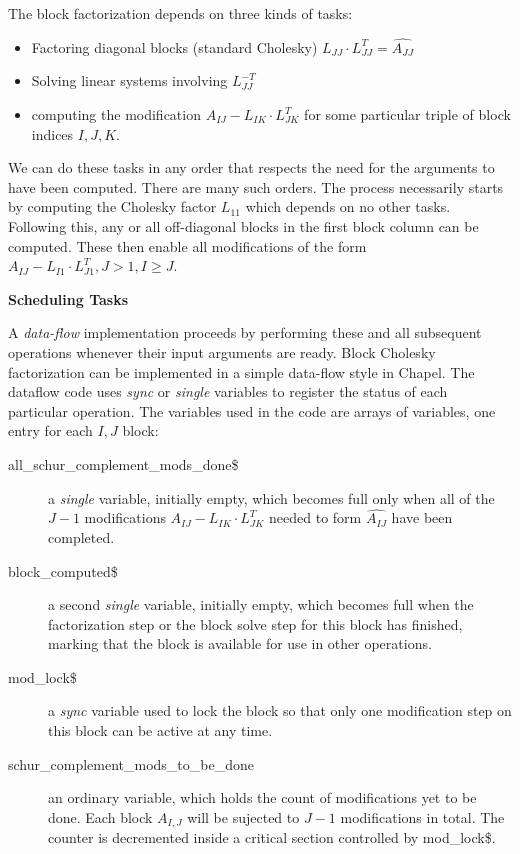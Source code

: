 \documentclass[12pt]{article}
\begin{document}
The block factorization depends on three kinds of tasks:
\begin{itemize}
\item Factoring diagonal blocks (standard Cholesky) 
  $L_{JJ} \cdot L_{JJ}^T = \widehat{A_{JJ}}$
\item Solving linear systems involving $L_{JJ}^{-T}$
\item computing the modification $A_{IJ} - L_{IK} \cdot L_{JK}^T$ for some
  particular triple of block indices $I, J, K$.
\end{itemize}
We can do these tasks in any order that respects the need for the arguments to
have been computed.  There are many such orders.  The process necessarily starts
by computing the Cholesky factor $L_{11}$ which depends on no other tasks.
Following this, any or all off-diagonal blocks in the first block column can be
computed.  These then enable all modifications of the form $A_{IJ} - L_{I1}
\cdot L_{J1}^T, J > 1, I \ge J$.

{\large \bf Scheduling Tasks}

A \emph{data-flow} implementation proceeds by performing these and all
subsequent operations whenever their input arguments are ready.  Block Cholesky
factorization can be implemented in a simple data-flow style in Chapel.  The
dataflow code uses \emph{sync} or \emph{single} variables to register the status
of each particular operation.  The variables used in the code are arrays of
variables, one entry for each $I,J$ block:
\begin{description}
  \item [all\_schur\_complement\_mods\_done\$ ] a \emph{single} variable, initially
    empty, which becomes full only when all of the $J-1$ modifications $A_{IJ} -
    L_{IK} \cdot L_{JK}^T$ needed to form $\widehat{A_{IJ}}$ have been
    completed.

  \item [block\_computed\$] a second \emph{single} variable, initially empty, which
    becomes full when the factorization step or the block solve step for this
    block has finished, marking that the block is available for use in other
    operations.
  
    \item [mod\_lock\$] a \emph{sync} variable used to lock the block so that only one
      modification step on this block can be active at any time.

    \item [schur\_complement\_mods\_to\_be\_done] an ordinary variable, which
      holds the count of modifications yet to be done.  Each block $A_{I,J}$
      will be sujected to $J-1$ modifications in total.  The counter is
      decremented inside a critical section controlled by mod\_lock\$.
\end{description}
\end{document}
